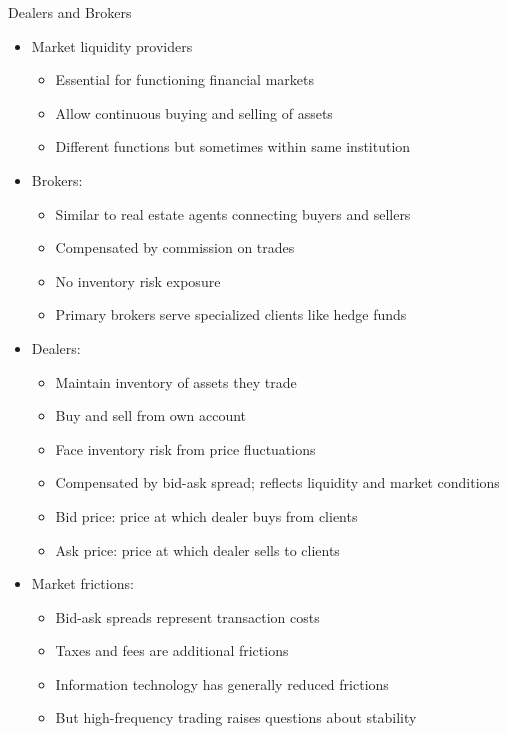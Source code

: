 \documentclass[10pt,handout]{beamer}
\begin{document}
\begin{frame}{Dealers and Brokers}
  \begin{itemize}[<+->]
    \item Market liquidity providers
      \begin{itemize}
        \item Essential for functioning financial markets
        \item Allow continuous buying and selling of assets
        \item Different functions but sometimes within same institution
      \end{itemize}
    \item Brokers:
      \begin{itemize}
        \item Similar to real estate agents connecting buyers and sellers
        \item Compensated by commission on trades
        \item No inventory risk exposure
        \item Primary brokers serve specialized clients like hedge funds
      \end{itemize}
    \item Dealers:
      \begin{itemize}
        \item Maintain inventory of assets they trade
        \item Buy and sell from own account
        \item Face inventory risk from price fluctuations
        \item Compensated by bid-ask spread; reflects liquidity and market conditions
        \item Bid price: price at which dealer buys from clients
        \item Ask price: price at which dealer sells to clients
      \end{itemize}
    \item Market frictions:
      \begin{itemize}
        \item Bid-ask spreads represent transaction costs
        \item Taxes and fees are additional frictions
        \item Information technology has generally reduced frictions
        \item But high-frequency trading raises questions about stability
      \end{itemize}
  \end{itemize}
\end{frame}
\end{document}
